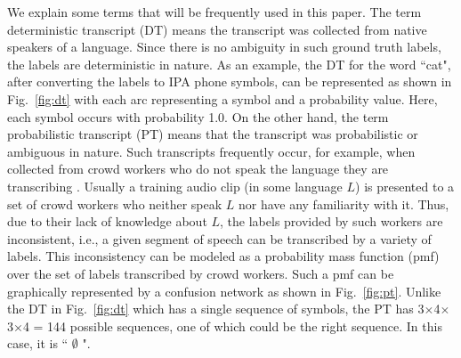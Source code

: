 \documentclass[a4paper]{article}
\begin{document}
We explain some terms that will be frequently used in this paper. The term deterministic transcript (DT) means the transcript was collected from native speakers of a language. Since there is no ambiguity in such ground truth labels, the labels are deterministic in nature. As an example, the DT for the word ``cat", after converting the labels to IPA phone symbols, can be represented as shown in Fig.~\ref{fig:dt} with each arc representing a symbol and a probability value. Here, each symbol occurs with probability 1.0. On the other hand, the term probabilistic transcript (PT) means that the transcript was probabilistic or ambiguous in nature. Such transcripts frequently occur, for example, when collected from crowd workers who do not speak the language they are transcribing \cite{Jyothi-MismatchedCrowdsourcingTrans}. Usually a training audio clip (in some language $L$) is presented to a set of crowd workers who neither speak $L$ nor have any familiarity with it. Thus, due to their lack of knowledge about $L$, the labels provided by such workers are inconsistent, i.e., a given segment of speech can be transcribed by a variety of labels. This inconsistency can be modeled as a probability mass function (pmf) over the set of labels transcribed by crowd workers. Such a pmf can be graphically represented by a confusion network as shown in Fig.~\ref{fig:pt}. Unlike the DT in Fig.~\ref{fig:dt} which has a single sequence of symbols, the PT has 3$\times$4$\times$3$\times$4 = 144 possible sequences, one of which could be the right sequence. In this case, it is `` \ipa{\ae} $\emptyset$ ".

\end{document}
